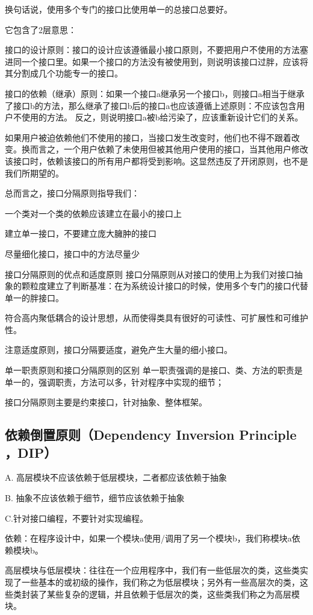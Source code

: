 换句话说，使用多个专门的接口比使用单一的总接口总要好。

它包含了2层意思：

接口的设计原则：接口的设计应该遵循最小接口原则，不要把用户不使用的方法塞进同一个接口里。如果一个接口的方法没有被使用到，则说明该接口过胖，应该将其分割成几个功能专一的接口。

接口的依赖（继承）原则：如果一个接口a继承另一个接口b，则接口a相当于继承了接口b的方法，那么继承了接口b后的接口a也应该遵循上述原则：不应该包含用户不使用的方法。 反之，则说明接口a被b给污染了，应该重新设计它们的关系。

如果用户被迫依赖他们不使用的接口，当接口发生改变时，他们也不得不跟着改变。换而言之，一个用户依赖了未使用但被其他用户使用的接口，当其他用户修改该接口时，依赖该接口的所有用户都将受到影响。这显然违反了开闭原则，也不是我们所期望的。

总而言之，接口分隔原则指导我们：

一个类对一个类的依赖应该建立在最小的接口上

建立单一接口，不要建立庞大臃肿的接口

尽量细化接口，接口中的方法尽量少

接口分隔原则的优点和适度原则
接口分隔原则从对接口的使用上为我们对接口抽象的颗粒度建立了判断基准：在为系统设计接口的时候，使用多个专门的接口代替单一的胖接口。

符合高内聚低耦合的设计思想，从而使得类具有很好的可读性、可扩展性和可维护性。

注意适度原则，接口分隔要适度，避免产生大量的细小接口。

单一职责原则和接口分隔原则的区别
单一职责强调的是接口、类、方法的职责是单一的，强调职责，方法可以多，针对程序中实现的细节；

接口分隔原则主要是约束接口，针对抽象、整体框架。

\subsection{依赖倒置原则（Dependency Inversion Principle ，DIP）}
A. 高层模块不应该依赖于低层模块，二者都应该依赖于抽象

B. 抽象不应该依赖于细节，细节应该依赖于抽象

C.针对接口编程，不要针对实现编程。

依赖：在程序设计中，如果一个模块a使用/调用了另一个模块b，我们称模块a依赖模块b。

高层模块与低层模块：往往在一个应用程序中，我们有一些低层次的类，这些类实现了一些基本的或初级的操作，我们称之为低层模块；另外有一些高层次的类，这些类封装了某些复杂的逻辑，并且依赖于低层次的类，这些类我们称之为高层模块。

